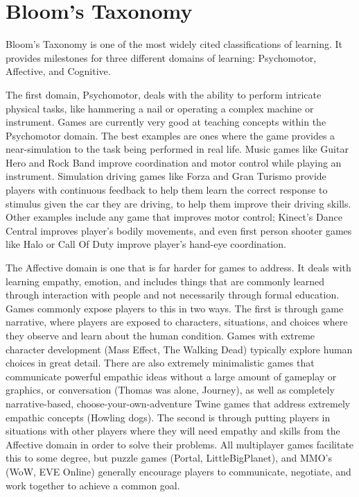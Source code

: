 \documentclass[12pt]{report}
\begin{document}
	\section{Bloom's Taxonomy}

		Bloom's Taxonomy is one of the most widely cited classifications of learning. It provides milestones for three different domains of learning: Psychomotor, Affective, and Cognitive.

		The first domain, Psychomotor, deals with the ability to perform intricate physical tasks, like hammering a nail or operating a complex machine or instrument. Games are currently very good at teaching concepts within the Psychomotor domain. The best examples are ones where the game provides a near-simulation to the task being performed in real life. Music games like Guitar Hero and Rock Band improve coordination and motor control while playing an instrument. Simulation driving games like Forza and Gran Turismo provide players with continuous feedback to help them learn the correct response to stimulus given the car they are driving, to help them improve their driving skills. Other examples include any game that improves motor control; Kinect's Dance Central improves player's bodily movements, and even first person shooter games like Halo or Call Of Duty improve player's hand-eye coordination.

		The Affective domain is one that is far harder for games to address. It deals with learning empathy, emotion, and includes things that are commonly learned through interaction with people and not necessarily through formal education. Games commonly expose players to this in two ways. The first is through game narrative, where players are exposed to characters, situations, and choices where they observe and learn about the human condition. Games with extreme character development (Mass Effect, The Walking Dead) typically explore human choices in great detail. There are also extremely minimalistic games that communicate powerful empathic ideas without a large amount of gameplay or graphics, or conversation (Thomas was alone, Journey), as well as completely narrative-based, choose-your-own-adventure Twine games that address extremely empathic concepts (Howling dogs). The second is through putting players in situations with other players where they will need empathy and skills from the Affective domain in order to solve their problems. All multiplayer games facilitate this to some degree, but puzzle games (Portal, LittleBigPlanet), and MMO's (WoW, EVE Online) generally encourage players to communicate, negotiate, and work together to achieve a common goal.
\end{document}
